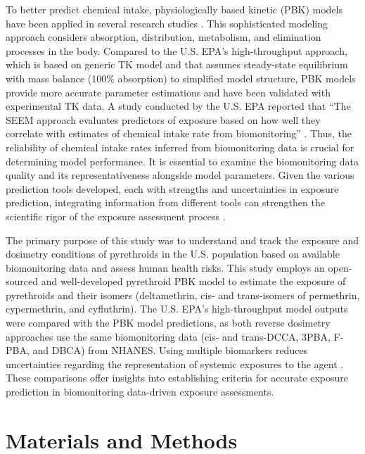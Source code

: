 \documentclass[toxics,article,submit,pdftex,moreauthors]{Definitions/mdpi}
\begin{document}
To better predict chemical intake, physiologically based kinetic (PBK) models
have been applied in several research studies \citep{tan2006use, allen2007use,
lyons2008computational, tornero2012pharmacokinetic, moreau2017using}. This
sophisticated modeling approach considers absorption, distribution, metabolism,
and elimination processes in the body. Compared to the U.S. EPA's
high-throughput approach, which is based on generic TK model and that assumes
steady-state equilibrium with mass balance (100\% absorption) to simplified
model structure, PBK models provide more accurate parameter estimations and
have been validated with experimental TK data. A study conducted by the U.S.
EPA reported that ``The SEEM approach evaluates predictors of exposure based on
how well they correlate with estimates of chemical intake rate from
biomonitoring'' \citep{ring2018consensus}. Thus, the reliability of chemical
intake rates inferred from biomonitoring data is crucial for determining model
performance. It is essential to examine the biomonitoring data quality and its
representativeness alongside model parameters. Given the various prediction
tools developed, each with strengths and uncertainties in exposure prediction,
integrating information from different tools can strengthen the scientific
rigor of the exposure assessment process \citep{moreau2017using}.

The primary purpose of this study was to understand and track the
exposure and dosimetry conditions of pyrethroids in the U.S. population
based on available biomonitoring data and assess human health risks.
This study employs an open-sourced and well-developed pyrethroid PBK
model to estimate the exposure of pyrethroids and their isomers
(deltamethrin, cis- and trans-isomers of permethrin, cypermethrin, and
cyfluthrin). The U.S. EPA's high-throughput model outputs were compared
with the PBK model predictions, as both reverse dosimetry approaches use
the same biomonitoring data (cis- and trans-DCCA, 3PBA, F-PBA, and DBCA)
from NHANES. Using multiple biomarkers reduces uncertainties regarding
the representation of systemic exposures to the agent
\citep{lin2023reconstructing}. These comparisons offer insights into
establishing criteria for accurate exposure prediction in biomonitoring
data-driven exposure assessments.



\section{Materials and Methods}\label{materials-and-methods}
\end{document}
